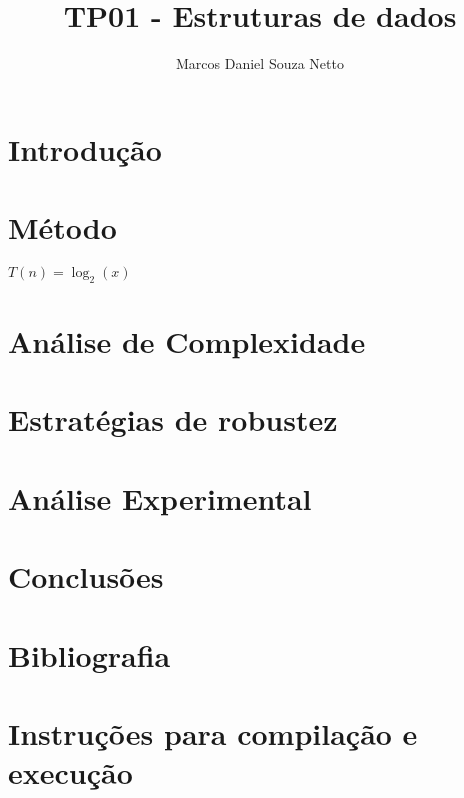 \documentclass{article}
\title{TP01 - Estruturas de dados}
\author{Marcos Daniel Souza Netto}
\begin{document}
\maketitle

\section{Introdução}

\section{Método}

$T(n) = \log_2(x)$

\section{Análise de Complexidade}

\section{Estratégias de robustez}

\section{Análise Experimental}

\section{Conclusões}

\section*{Bibliografia}


\section*{Instruções para compilação e execução}
\end{document}
